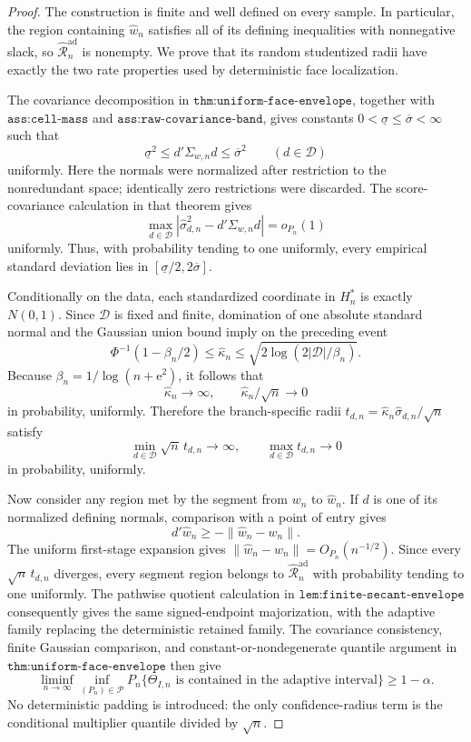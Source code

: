 \documentclass{article}
\begin{document}
\begin{proof}
The construction is finite and well defined on every sample. In particular, the region containing \(\widehat w_n\) satisfies all of its defining inequalities with nonnegative slack, so \(\widehat{\mathcal R}_n^{\mathrm{ad}}\) is nonempty. We prove that its random studentized radii have exactly the two rate properties used by deterministic face localization.

The covariance decomposition in \(\texttt{thm:uniform-face-envelope}\), together with \(\texttt{ass:cell-mass}\) and \(\texttt{ass:raw-covariance-band}\), gives constants \(0<\underline\sigma\le\overline\sigma<\infty\) such that
\[
 \underline\sigma^2\le d'\Sigma_{w,n}d\le\overline\sigma^2
 \qquad(d\in\mathcal D)
\]
uniformly. Here the normals were normalized after restriction to the nonredundant space; identically zero restrictions were discarded. The score-covariance calculation in that theorem gives
\[
 \max_{d\in\mathcal D}
 |\widehat\sigma_{d,n}^2-d'\Sigma_{w,n}d|=o_{P_n}(1)
\]
uniformly. Thus, with probability tending to one uniformly, every empirical standard deviation lies in
\([\underline\sigma/2,2\overline\sigma]\).

Conditionally on the data, each standardized coordinate in \(H_n^*\) is exactly \(N(0,1)\). Since \(\mathcal D\) is fixed and finite, domination of one absolute standard normal and the Gaussian union bound imply on the preceding event
\[
 \Phi^{-1}(1-\beta_n/2)
 \le\widehat\kappa_n
 \le\sqrt{2\log(2|\mathcal D|/\beta_n)}.
\]
Because \(\beta_n=1/\log(n+\mathrm e^2)\), it follows that
\[
 \widehat\kappa_n\longrightarrow\infty,
 \qquad
 \widehat\kappa_n/\sqrt n\longrightarrow0
\]
in probability, uniformly. Therefore the branch-specific radii
\(t_{d,n}=\widehat\kappa_n\widehat\sigma_{d,n}/\sqrt n\) satisfy
\[
 \min_{d\in\mathcal D}\sqrt n\,t_{d,n}\longrightarrow\infty,
 \qquad
 \max_{d\in\mathcal D}t_{d,n}\longrightarrow0
\]
in probability, uniformly.

Now consider any region met by the segment from \(w_n\) to \(\widehat w_n\). If \(d\) is one of its normalized defining normals, comparison with a point of entry gives
\[
 d'\widehat w_n\ge-\lVert\widehat w_n-w_n\rVert.
\]
The uniform first-stage expansion gives
\(\lVert\widehat w_n-w_n\rVert=O_{P_n}(n^{-1/2})\). Since every \(\sqrt n\,t_{d,n}\) diverges, every segment region belongs to \(\widehat{\mathcal R}_n^{\mathrm{ad}}\) with probability tending to one uniformly. The pathwise quotient calculation in \(\texttt{lem:finite-secant-envelope}\) consequently gives the same signed-endpoint majorization, with the adaptive family replacing the deterministic retained family. The covariance consistency, finite Gaussian comparison, and constant-or-nondegenerate quantile argument in \(\texttt{thm:uniform-face-envelope}\) then give
\[
 \liminf_{n\to\infty}\inf_{(P_n)\in\mathcal P}
 P_n\{\Theta_{I,n}\text{ is contained in the adaptive interval}\}
 \ge1-\alpha.
\]
No deterministic padding is introduced: the only confidence-radius term is the conditional multiplier quantile divided by \(\sqrt n\).


\end{proof}
\end{document}

